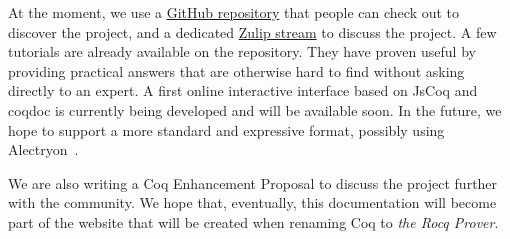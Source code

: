 \documentclass{easychair}
\begin{document}
At the moment, we use a \href{https://github.com/Zimmi48/platform-docs}{GitHub repository}
that people can check out to discover the project, and a dedicated
\href{https://coq.zulipchat.com/#narrow/stream/437203-Platform-docs}{Zulip stream}
to discuss the project.
A few tutorials are already available on the repository.
They have proven useful by providing practical answers that are
otherwise hard to find without asking directly to an expert.
A first online interactive interface based on JsCoq and coqdoc is currently
being developed and will be available soon.
In the future, we hope to support a more standard and expressive format,
possibly using Alectryon~\cite{pit2020untangling}.

We are also writing a Coq Enhancement Proposal to discuss the project further with the community.
We hope that, eventually, this documentation will become part of the website that will be created when renaming Coq to \emph{the Rocq Prover}.

\label{sect:bib}


\end{document}

